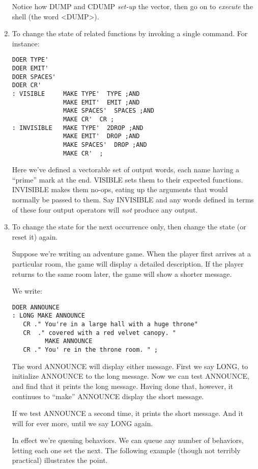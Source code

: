 \begin{enumerate}
Notice how DUMP and CDUMP \emph{set-up} the vector, then go on to
\emph{execute} the shell (the word <DUMP>).

\item To change the state of related functions by invoking a single command. For
instance:

\begin{verbatim}
DOER TYPE'
DOER EMIT'
DOER SPACES'
DOER CR'
: VISIBLE     MAKE TYPE'  TYPE ;AND
              MAKE EMIT'  EMIT ;AND
              MAKE SPACES'  SPACES ;AND
              MAKE CR'  CR ;
: INVISIBLE   MAKE TYPE'  2DROP ;AND
              MAKE EMIT'  DROP ;AND
              MAKE SPACES'  DROP ;AND
              MAKE CR'  ;
\end{verbatim}

Here we've defined a vectorable set of output words, each name having a
``prime'' mark at the end. VISIBLE sets them to their expected functions.
INVISIBLE makes them no-ops, eating up the arguments that would normally
be passed to them. Say INVISIBLE and any words defined in terms
of these four output operators will \emph{not} produce any output.

\item To change the state for the next occurrence only, then change the state (or
reset it) again.

Suppose we're writing an adventure game. When the player first arrives at
a particular room, the game will display a detailed description. If the player
returns to the same room later, the game will show a shorter message.

We write:

\begin{verbatim}
DOER ANNOUNCE
: LONG MAKE ANNOUNCE
   CR ." You're in a large hall with a huge throne"
   CR  ." covered with a red velvet canopy. "
         MAKE ANNOUNCE
   CR ." You' re in the throne room. " ;
\end{verbatim}

The word ANNOUNCE will display either message. First we say LONG, to
initialize ANNOUNCE to the long message. Now we can test ANNOUNCE,
and find that it prints the long message. Having done that,
however, it continues to ``make'' ANNOUNCE display the short message.

If we test ANNOUNCE a second time, it prints the short message. And it
will for ever more, until we say LONG again.

In effect we're queuing behaviors. We can queue any number of behaviors,
letting each one set the next. The following example (though not terribly
practical) illustrates the point.


\end{enumerate}
